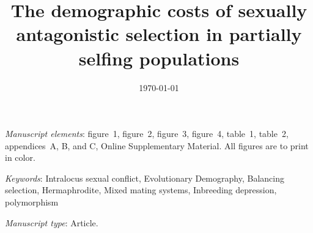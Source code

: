 \documentclass[11pt]{article}
\begin{document}
\title{The demographic costs of sexually antagonistic selection in partially selfing populations}





\date{\today}
\maketitle




\bigskip

\textit{Manuscript elements}: figure~1, figure~2, figure~3, figure~4, table~1, table~2, appendices~A, B, and C, Online Supplementary Material. All figures are to print in color.

\bigskip

\textit{Keywords}: Intralocus sexual conflict, Evolutionary Demography, Balancing selection, Hermaphrodite, Mixed mating systems, Inbreeding depression, polymorphism 

\bigskip

\textit{Manuscript type}: Article. %

\bigskip

\end{document}
